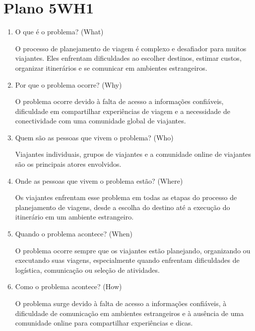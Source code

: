 \documentclass{article}
\begin{document}
\section{Plano 5WH1}

\begin{enumerate}
      \item O que é o problema? (What)

            O processo de planejamento de viagem é complexo e desafiador para muitos viajantes. Eles enfrentam dificuldades ao escolher destinos, estimar custos, organizar itinerários e se comunicar em ambientes estrangeiros.
      \item Por que o problema ocorre? (Why)

            O problema ocorre devido à falta de acesso a informações confiáveis, dificuldade em compartilhar experiências de viagem e a necessidade de conectividade com uma comunidade global de viajantes.
      \item Quem são as pessoas que vivem o problema? (Who)

            Viajantes individuais, grupos de viajantes e a comunidade online de viajantes são os principais atores envolvidos.
      \item Onde as pessoas que vivem o problema estão? (Where)

            Os viajantes enfrentam esse problema em todas as etapas do processo de planejamento de viagens, desde a escolha do destino até a execução do itinerário em um ambiente estrangeiro.
      \item Quando o problema acontece? (When)

            O problema ocorre sempre que os viajantes estão planejando, organizando ou executando suas viagens, especialmente quando enfrentam dificuldades de logística, comunicação ou seleção de atividades.
      \item Como o problema acontece? (How)

            O problema surge devido à falta de acesso a informações confiáveis, à dificuldade de comunicação em ambientes estrangeiros e à ausência de uma comunidade online para compartilhar experiências e dicas.

\end{enumerate}

\bigskip
\end{document}
